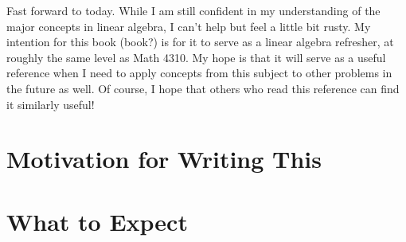 \documentclass[paper=a4, fontsize=11pt,twoside]{scrartcl}   %
\begin{document}
Fast forward to today. While I am still confident in my understanding of the major concepts in linear algebra, I can't help but feel a little bit rusty. My intention for this book (book?)
is for it to serve as a linear algebra refresher, at roughly the same level as Math 4310. My hope is that it will serve as a useful reference when I need to apply concepts from this subject to other problems in the future as well. Of course, I hope that others who read this reference can find it similarly useful!

\section{Motivation for Writing This}

\section{What to Expect}
\end{document}
